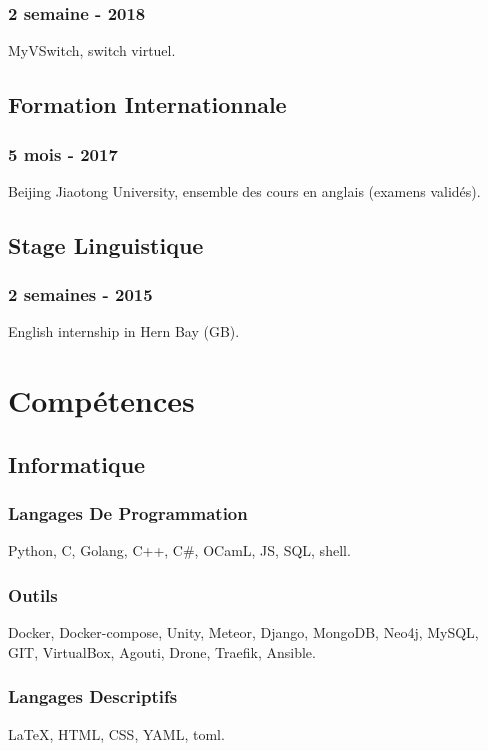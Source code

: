 \documentclass{article}
\begin{document}
\begin{multicols}{2}
                \subsubsection{2 semaine - 2018}
                    MyVSwitch, switch virtuel.
            \subsection{Formation Internationnale}
                \subsubsection{5 mois - 2017}
                    Beijing Jiaotong University, ensemble des cours en anglais (examens valid\'es).
            \subsection{Stage Linguistique}
                \subsubsection{2 semaines - 2015}
                    English internship in Hern Bay (GB).

        \columnbreak

        \section{Comp\'etences}
            \subsection{Informatique}
                \subsubsection{Langages De Programmation}
                    Python, C, Golang, C++, C\#, OCamL, JS, SQL, shell.
                \subsubsection{Outils}
                    Docker, Docker-compose, Unity, Meteor, Django, MongoDB, Neo4j, MySQL, GIT, VirtualBox, Agouti, Drone, Traefik, Ansible.
                \subsubsection{Langages Descriptifs}
                    {\LaTeX}, HTML, CSS, YAML, toml.

\end{multicols}
\end{document}
